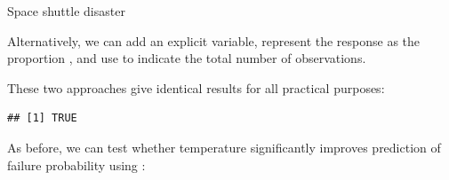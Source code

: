 \documentclass[11pt]{book}
\renewenvironment{knitrout}{\small\renewcommand{\baselinestretch}{.85}}{} %
\begin{document}
\begin{Example}{Space shuttle disaster}
\begin{knitrout}
\color{fgcolor}\begin{kframe}
\begin{alltt}
\hlstd{(}\hlstd{,} \hlstd{=}\hlstd{)}
 \hlkwb{<-} \hlstd{(}  \hlopt{-}  \hlopt{~} 
             
           
\end{alltt}
\end{kframe}
\end{knitrout}
Alternatively, we can add an explicit  variable,
represent the response as the proportion ,
and use  to indicate the total number of
observations.
\begin{knitrout}
\color{fgcolor}\begin{kframe}
\begin{alltt}
\hlopt{$} \hlkwb{<-} 
 \hlkwb{<-} \hlopt{/} \hlopt{~}   
             
           
\end{alltt}
\end{kframe}
\end{knitrout}
These two approaches give identical results for all practical purposes:
\begin{knitrout}
\color{fgcolor}\begin{kframe}
\begin{alltt}
\hlstd{(} 
\end{alltt}
\begin{verbatim}
## [1] TRUE
\end{verbatim}
\end{kframe}
\end{knitrout}
As before, we can test whether temperature significantly improves prediction
of failure probability using :
\begin{knitrout}
\color{fgcolor}\begin{kframe}

\end{kframe}
\end{knitrout}
\end{Example}
\end{document}
